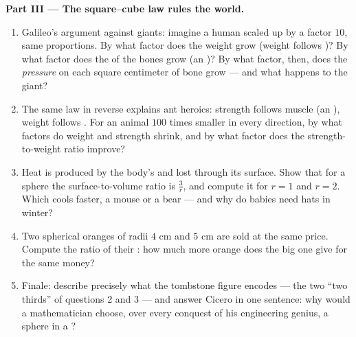 \begin{problem}
\medskip
\noindent\textbf{Part III --- The square--cube law rules the
world.}
\begin{enumerate}[resume]
  \item Galileo's argument against giants: imagine a human
        scaled up by a factor $10$, same proportions. By what
        factor does the weight grow (weight follows )? By
        what factor does the  of the bones grow
        (an )? By what factor, then, does the \emph{pressure}
        on each square centimeter of bone grow --- and what
        happens to the giant?
  \item The same law in reverse explains ant heroics: strength
        follows muscle  (an ), weight follows
        . For an animal $100$ times smaller in every
        direction, by what factors do weight and strength
        shrink, and by what factor does the strength-to-weight
        ratio improve?
  \item Heat is produced by the body's  and lost through
        its surface. Show that for a sphere the
        surface-to-volume ratio is $\frac{3}{r}$, and compute it
        for $r = 1$ and $r = 2$. Which cools faster, a mouse or
        a bear --- and why do babies need hats in winter?
  \item Two spherical oranges of radii $4$ cm and $5$ cm are
        sold at the same price. Compute the ratio of their
        : how much more orange does the big one give for
        the same money?
  \item Finale: describe precisely what the tombstone figure
        encodes --- the two ``two thirds'' of questions 2 and 3
        --- and answer Cicero in one sentence: why would a
        mathematician choose, over every conquest of his
        engineering genius, a sphere in a ?
\end{enumerate}
\end{problem}

